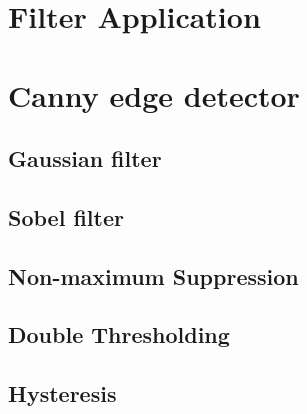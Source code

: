 \section{Filter Application}
\label{sec:filterapp}


\section{Canny edge detector}
\label{subsec:canny}


\subsection{Gaussian filter}
\label{subsec:gauss}


\subsection{Sobel filter}
\label{subsec:sobel}


\subsection{Non-maximum Suppression}
\label{subsec:non-maximum-suppression}

\subsection{Double Thresholding}
\label{subsec:double-thresholding}

\subsection{Hysteresis}
\label{subsec:hysteresis}
